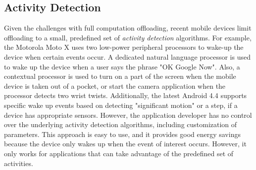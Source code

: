 
\subsection{Activity Detection}

Given the challenges with full computation offloading, recent mobile devices
limit offloading to a small, predefined set of \emph{activity detection}
algorithms. For example, the Motorola Moto X uses two low-power peripheral
processors to wake-up the device when certain events occur. A dedicated natural
language processor is used to wake up the device when a user says the phrase "OK
Google Now". Also, a contextual processor is used to turn on a part of the
screen when the mobile device is taken out of a pocket, or start the camera
application when the processor detects two wrist twists. Additionally, the
latest Android 4.4 supports specific wake up events based on detecting
"significant motion" or a step, if a device has appropriate sensors. However,
the application developer has no control over the underlying activity detection
algorithms, including customization of parameters. This approach is easy to use,
and it provides good energy savings because the device only wakes up when the
event of interest occurs. However, it only works for applications that can take
advantage of the predefined set of activities.




